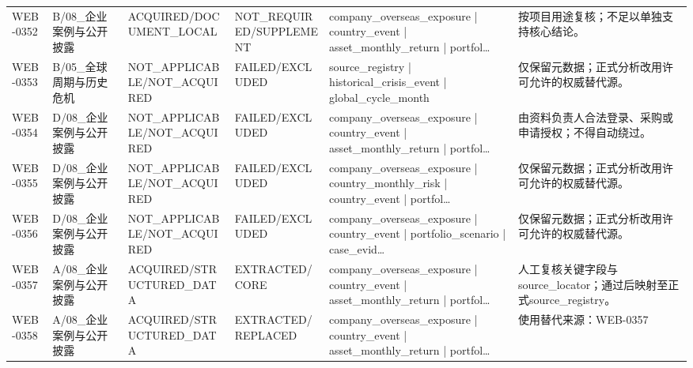\begin{landscape}
\begin{longtable}{p{1.8cm}p{2.6cm}p{2.6cm}p{2.6cm}p{4.8cm}p{7.2cm}}
WEB-0352 & B/\allowbreak{}08\_\allowbreak{}企业案例与公开披露 & ACQUIRED/\allowbreak{}DOCUMENT\_\allowbreak{}LOCAL & NOT\_\allowbreak{}REQUIRED/\allowbreak{}SUPPLEMENT & company\_\allowbreak{}overseas\_\allowbreak{}exposure | country\_\allowbreak{}event | asset\_\allowbreak{}monthly\_\allowbreak{}return | portfol… & 按项目用途复核；不足以单独支持核心结论。\\
WEB-0353 & B/\allowbreak{}05\_\allowbreak{}全球周期与历史危机 & NOT\_\allowbreak{}APPLICABLE/\allowbreak{}NOT\_\allowbreak{}ACQUIRED & FAILED/\allowbreak{}EXCLUDED & source\_\allowbreak{}registry | historical\_\allowbreak{}crisis\_\allowbreak{}event | global\_\allowbreak{}cycle\_\allowbreak{}month & 仅保留元数据；正式分析改用许可允许的权威替代源。\\
WEB-0354 & D/\allowbreak{}08\_\allowbreak{}企业案例与公开披露 & NOT\_\allowbreak{}APPLICABLE/\allowbreak{}NOT\_\allowbreak{}ACQUIRED & FAILED/\allowbreak{}EXCLUDED & company\_\allowbreak{}overseas\_\allowbreak{}exposure | country\_\allowbreak{}event | asset\_\allowbreak{}monthly\_\allowbreak{}return | portfol… & 由资料负责人合法登录、采购或申请授权；不得自动绕过。\\
WEB-0355 & D/\allowbreak{}08\_\allowbreak{}企业案例与公开披露 & NOT\_\allowbreak{}APPLICABLE/\allowbreak{}NOT\_\allowbreak{}ACQUIRED & FAILED/\allowbreak{}EXCLUDED & company\_\allowbreak{}overseas\_\allowbreak{}exposure | country\_\allowbreak{}monthly\_\allowbreak{}risk | country\_\allowbreak{}event | portfol… & 仅保留元数据；正式分析改用许可允许的权威替代源。\\
WEB-0356 & D/\allowbreak{}08\_\allowbreak{}企业案例与公开披露 & NOT\_\allowbreak{}APPLICABLE/\allowbreak{}NOT\_\allowbreak{}ACQUIRED & FAILED/\allowbreak{}EXCLUDED & company\_\allowbreak{}overseas\_\allowbreak{}exposure | country\_\allowbreak{}event | portfolio\_\allowbreak{}scenario | case\_\allowbreak{}evid… & 仅保留元数据；正式分析改用许可允许的权威替代源。\\
WEB-0357 & A/\allowbreak{}08\_\allowbreak{}企业案例与公开披露 & ACQUIRED/\allowbreak{}STRUCTURED\_\allowbreak{}DATA & EXTRACTED/\allowbreak{}CORE & company\_\allowbreak{}overseas\_\allowbreak{}exposure | country\_\allowbreak{}event | asset\_\allowbreak{}monthly\_\allowbreak{}return | portfol… & 人工复核关键字段与source\_\allowbreak{}locator；通过后映射至正式source\_\allowbreak{}registry。\\
WEB-0358 & A/\allowbreak{}08\_\allowbreak{}企业案例与公开披露 & ACQUIRED/\allowbreak{}STRUCTURED\_\allowbreak{}DATA & EXTRACTED/\allowbreak{}REPLACED & company\_\allowbreak{}overseas\_\allowbreak{}exposure | country\_\allowbreak{}event | asset\_\allowbreak{}monthly\_\allowbreak{}return | portfol… & 使用替代来源：WEB-0357\\

\end{longtable}
\end{landscape}

